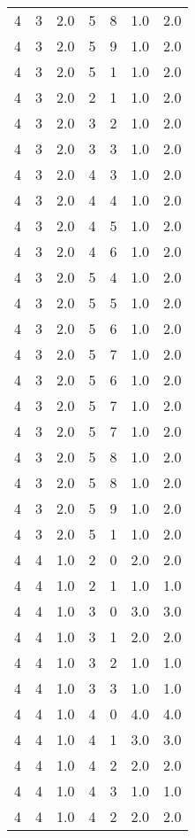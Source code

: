 \documentclass[a4paper,12pt]{article}
\begin{document}
\begin{center}
\begin{longtable}{ c c c | c c c | c }
        4 & 3 & 2.0 & 5 & 8 & 1.0 & 2.0 \\
        4 & 3 & 2.0 & 5 & 9 & 1.0 & 2.0 \\
        4 & 3 & 2.0 & 5 & 1 & 1.0 & 2.0 \\
        4 & 3 & 2.0 & 2 & 1 & 1.0 & 2.0 \\
        4 & 3 & 2.0 & 3 & 2 & 1.0 & 2.0 \\
        4 & 3 & 2.0 & 3 & 3 & 1.0 & 2.0 \\
        4 & 3 & 2.0 & 4 & 3 & 1.0 & 2.0 \\
        4 & 3 & 2.0 & 4 & 4 & 1.0 & 2.0 \\
        4 & 3 & 2.0 & 4 & 5 & 1.0 & 2.0 \\
        4 & 3 & 2.0 & 4 & 6 & 1.0 & 2.0 \\
        4 & 3 & 2.0 & 5 & 4 & 1.0 & 2.0 \\
        4 & 3 & 2.0 & 5 & 5 & 1.0 & 2.0 \\
        4 & 3 & 2.0 & 5 & 6 & 1.0 & 2.0 \\
        4 & 3 & 2.0 & 5 & 7 & 1.0 & 2.0 \\
        4 & 3 & 2.0 & 5 & 6 & 1.0 & 2.0 \\
        4 & 3 & 2.0 & 5 & 7 & 1.0 & 2.0 \\
        4 & 3 & 2.0 & 5 & 7 & 1.0 & 2.0 \\
        4 & 3 & 2.0 & 5 & 8 & 1.0 & 2.0 \\
        4 & 3 & 2.0 & 5 & 8 & 1.0 & 2.0 \\
        4 & 3 & 2.0 & 5 & 9 & 1.0 & 2.0 \\
        4 & 3 & 2.0 & 5 & 1 & 1.0 & 2.0 \\
        4 & 4 & 1.0 & 2 & 0 & 2.0 & 2.0 \\
        4 & 4 & 1.0 & 2 & 1 & 1.0 & 1.0 \\
        4 & 4 & 1.0 & 3 & 0 & 3.0 & 3.0 \\
        4 & 4 & 1.0 & 3 & 1 & 2.0 & 2.0 \\
        4 & 4 & 1.0 & 3 & 2 & 1.0 & 1.0 \\
        4 & 4 & 1.0 & 3 & 3 & 1.0 & 1.0 \\
        4 & 4 & 1.0 & 4 & 0 & 4.0 & 4.0 \\
        4 & 4 & 1.0 & 4 & 1 & 3.0 & 3.0 \\
        4 & 4 & 1.0 & 4 & 2 & 2.0 & 2.0 \\
        4 & 4 & 1.0 & 4 & 3 & 1.0 & 1.0 \\
        4 & 4 & 1.0 & 4 & 2 & 2.0 & 2.0 \\

\end{longtable}
\end{center}
\end{document}
